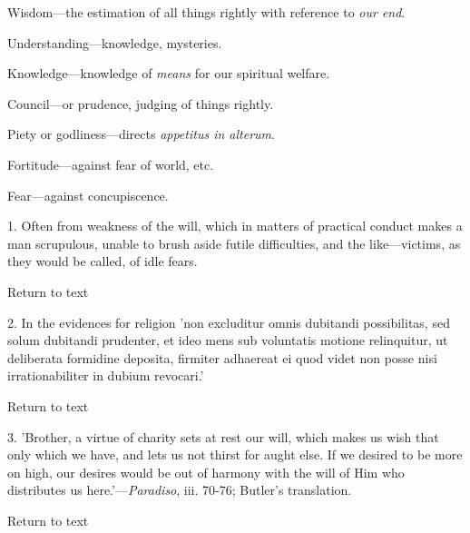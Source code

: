 Wisdom—the estimation of all things rightly
with reference to \emph{our end}.

Understanding—knowledge, mysteries.

Knowledge—knowledge of \emph{means} for our
spiritual welfare.

Council—or prudence, judging of things rightly.

Piety or godliness—directs \emph{appetitus in
alterum}.

Fortitude—against fear of world, etc.

Fear—against concupiscence.






1. Often from weakness of the will, which in
matters of practical conduct makes a man scrupulous, unable to brush
aside futile difficulties, and the like—victims, as they would be
called, of idle fears.

Return to text


2. In the evidences for
religion 'non excluditur omnis dubitandi possibilitas, sed solum
dubitandi prudenter, et ideo mens sub voluntatis motione relinquitur,
ut deliberata formidine deposita, firmiter adhaereat ei quod videt non
posse nisi irrationabiliter in dubium revocari.'

Return to text


3. 'Brother, a virtue of
charity sets at rest our will, which makes us wish that only which we
have, and lets us not thirst for aught else. If we desired to be more
on high, our desires would be out of harmony with the will of Him who
distributes us here.'—\emph{Paradiso}, iii. 70-76; Butler's
translation.

Return to text
